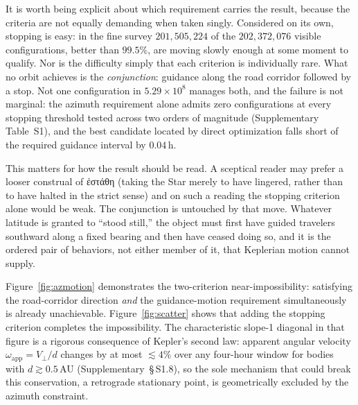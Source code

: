 \documentclass[sn-nature]{sn-jnl}
\newcommand{\grk}[1]{{\fontencoding{LGR}\selectfont #1}}
\newcommand{\grk}[1]{{\greekfont #1}}
\begin{document}
It is worth being explicit about which requirement carries the result, because
the criteria are not equally demanding when taken singly.  Considered on its
own, stopping is easy: in the fine survey $201{,}505{,}224$ of the
$202{,}372{,}076$ visible configurations, better than $99.5\%$, are moving
slowly enough at some moment to qualify.  Nor is the difficulty simply that
each criterion is individually rare.  What no orbit achieves is the
\emph{conjunction}: guidance along the road corridor followed by a stop.
Not one configuration in $5.29\times10^{8}$ manages both, and the failure is
not marginal: the azimuth requirement alone admits zero configurations at
every stopping threshold tested across two orders of magnitude
(Supplementary Table~S1), and the best candidate located by direct
optimization falls short of the required guidance interval by $0.04$\,h.

This matters for how the result should be read.  A sceptical reader may prefer
a looser construal of \grk{ἐστάθη} (taking the Star merely to have lingered,
rather than to have halted in the strict sense) and on such a reading the
stopping criterion alone would be weak.  The conjunction is untouched by that
move.  Whatever latitude is granted to ``stood still,'' the object must first
have guided travelers southward along a fixed bearing and then have ceased
doing so, and it is the ordered pair of behaviors, not either member of it,
that Keplerian motion cannot supply.

Figure~\ref{fig:azmotion} demonstrates the two-criterion near-impossibility:
satisfying the road-corridor direction \emph{and} the guidance-motion requirement
simultaneously is already unachievable. Figure~\ref{fig:scatter} shows that
adding the stopping criterion completes the impossibility. The characteristic
slope-1 diagonal in that figure is a rigorous consequence of Kepler's second
law: apparent angular velocity $\omega_\mathrm{app} = V_\perp/d$ changes by at
most $\lesssim\!4\%$ over any four-hour window for bodies with
$d \gtrsim 0.5$\,AU (Supplementary~\S\,S1.8), so the sole mechanism that could
break this conservation, a retrograde stationary point, is geometrically
excluded by the azimuth constraint.
\end{document}
